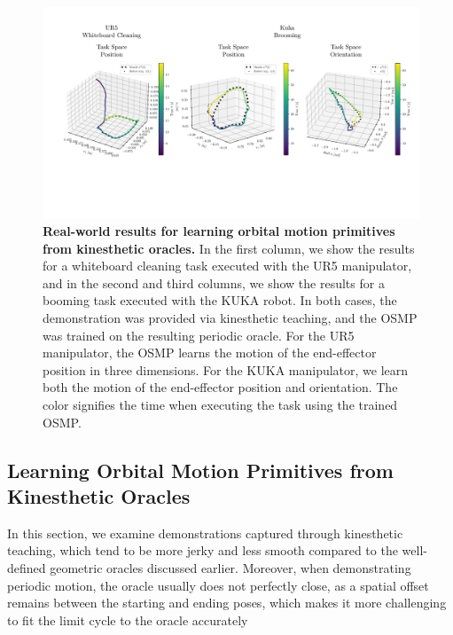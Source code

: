 \begin{figure}
    \centering
    \includegraphics[width=1.0\linewidth]{osmp/figures/kinesthetic_teaching_results/kinesthetic_teaching_results_v1_cropped.pdf}
    \caption{\textbf{Real-world results for learning orbital motion primitives from kinesthetic oracles.}
    In the first column, we show the results for a whiteboard cleaning task executed with the UR5 manipulator, and in the second and third columns, we show the results for a booming task executed with the KUKA robot.
    In both cases, the demonstration was provided via kinesthetic teaching, and the \gls{OSMP} was trained on the resulting periodic oracle.
    For the UR5 manipulator, the \gls{OSMP} learns the motion of the end-effector position in three dimensions. For the KUKA manipulator, we learn both the motion of the end-effector position and orientation.
    The color signifies the time when executing the task using the trained \gls{OSMP}.
    }
    \label{fig:osmp:kinesthetic_teaching_results}
\end{figure}

\subsection{Learning Orbital Motion Primitives from Kinesthetic Oracles}

In this section, we examine demonstrations captured through kinesthetic teaching, which tend to be more jerky and less smooth compared to the well-defined geometric oracles discussed earlier. Moreover, when demonstrating periodic motion, the oracle usually does not perfectly close, as a spatial offset remains between the starting and ending poses, which makes it more challenging to fit the limit cycle to the oracle accurately


